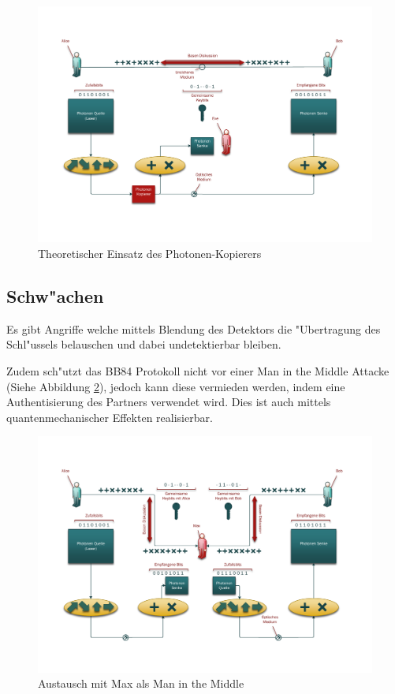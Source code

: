   \begin{figure}
    \centering
    \includegraphics[height=0.45\textheight]{crypto/BB84Eve-Clone.pdf}
    \caption{Theoretischer Einsatz des Photonen-Kopierers\label{crypto:BB84Clone}}
  \end{figure}

  \subsection{Schw"achen}
  Es gibt Angriffe welche mittels Blendung des Detektors die "Ubertragung des Schl"ussels belauschen
  und dabei undetektierbar bleiben. \cite{qc:detector}

  Zudem sch"utzt das BB84 Protokoll nicht vor einer Man in the Middle Attacke (Siehe Abbildung \ref{crypto:BB84Max}),
  jedoch kann diese vermieden werden, indem eine Authentisierung des Partners verwendet wird.
  Dies ist auch mittels quantenmechanischer Effekten realisierbar. \cite{qc:Authentisierung}

  \begin{figure}
    \centering
    \includegraphics[height=0.45\textheight]{crypto/BB84Max.pdf}
    \caption{Austausch mit Max als Man in the Middle\label{crypto:BB84Max}}
  \end{figure}
